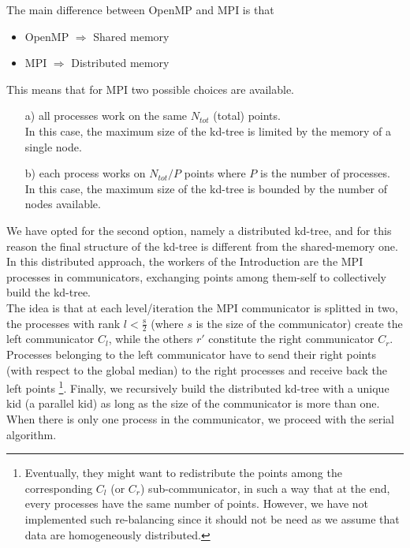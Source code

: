 \documentclass[amssymb, aps,nofootinbib, superscriptaddress, notitlepage]{revtex4}
\begin{document}
The main difference between OpenMP and MPI is that 
\begin{itemize}
\item OpenMP $\Longrightarrow$ Shared memory
\item MPI $\Longrightarrow$ Distributed memory
\end{itemize}
This means that for MPI two possible choices are available.
\begin{enumerate}
\item[a)] all processes work on the same $N_{tot}$ (total) points.
\\
 In this case, the maximum size of the kd-tree is limited by the memory of a single node.
\item[b)] each process works on $N_{tot}/P$ points where $P$ is the number of processes. 
\\
In this case, the maximum size of the kd-tree is bounded by the number of nodes available.
\end{enumerate}
We have opted for the second option, namely a distributed kd-tree, and for this reason the final structure of the kd-tree is different from the shared-memory one.
\\
In this distributed approach, the workers of the Introduction are the MPI processes in communicators, exchanging points among them-self to collectively build the  kd-tree. 
\\
The idea is that at each level/iteration the MPI communicator is  splitted in two, the processes with rank $l<\frac{\text{s}}{2}$ (where $s$ is the size of the communicator) create the left communicator $C_l$, while the others $r'$ constitute the right communicator $C_r$. 
Processes belonging to the  left communicator have to send their right points (with respect to the global median)  to the right processes and receive back the  left points   \footnote{Eventually, they might want to redistribute the points among the corresponding  $C_l$ (or $C_r$)  sub-communicator, in such a way that at the end, every processes have the same number of points. However, we have not implemented such re-balancing since it should not be need as we assume that data are homogeneously distributed.}.  
Finally,  we recursively build the distributed kd-tree with a unique kid (a parallel kid) as long as the size of the communicator is more than one. When there is only one process in the communicator, we proceed with the serial algorithm.
\end{document}
